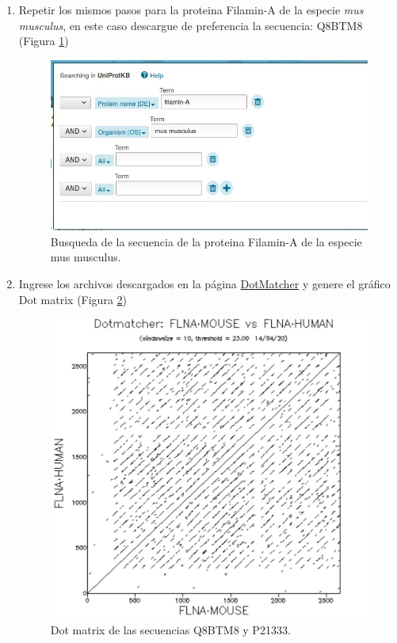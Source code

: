 \documentclass{article}
\begin{document}
\begin{enumerate}
    \item Repetir los mismos pasos para la proteina Filamin-A de la especie \textit{mus musculus}, en este caso descargue de preferencia la secuencia: Q8BTM8 (Figura \ref{img:uniprot5})
    
    \begin{figure}[h]
     \centering
        \includegraphics[width=\textwidth,height=0.3\textheight,keepaspectratio]{../img/alignment/uniprot5.jpg}
        \caption{Busqueda de la secuencia de la proteina Filamin-A de la especie mus musculus.}
        \label{img:uniprot5}
    \end{figure}
    
    \item Ingrese los archivos descargados en la página \href{http://bioinfo.nhri.org.tw/cgi-bin/emboss/dotmatcher}{DotMatcher} y genere el gráfico Dot matrix (Figura \ref{img:dot2})
    
    \begin{figure}[h]
     \centering
        \includegraphics[width=\textwidth,height=0.4\textheight,keepaspectratio]{../img/alignment/dot2.jpg}
        \caption{Dot matrix de las secuencias Q8BTM8 y P21333.}
        \label{img:dot2}
    \end{figure}
   
\end{enumerate}
\end{document}
